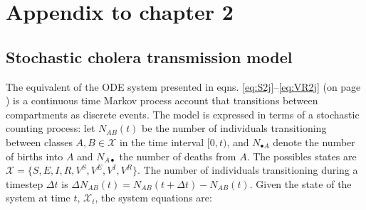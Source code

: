 \renewcommand{\thefigure}{\textsc{a}\arabic{figure}}
\renewcommand{\theequation}{\textsc{a}\arabic{equation}}
\renewcommand{\thetable}{\textsc{a}\arabic{table}}
\setcounter{figure}{0}
\setcounter{equation}{0}

\chapter{Appendix to chapter 2}
\section{Stochastic cholera transmission model}\label{sec:stoch}
The equivalent of the ODE system presented in eqns. \eqref{eq:S2j}--\eqref{eq:VR2j} (on page \pageref{eq:S2j}) is  a continuous time Markov process account that transitions between compartments as discrete events. The model is expressed in terms of a stochastic counting process\cite{Breto:TimeSeriesAnalysis:2009}: let \(N_{AB}(t)\) be the number of individuals
transitioning between classes \(A,B\in \mathcal{X}\) in the time
interval \([0,t)\), and \(N_{\bullet A}\) denote the number of births into \(A\) and \(N_{A\bullet}\) the number of deaths from \(A\).  The possibles states are
\(\mathcal{X} = \{S, E, I, R, V^S, V^E, V^I, V^R\}\).
The number of individuals transitioning  during a timestep $\Delta t$ is
\(\Delta N_{AB}(t) = N_{AB}(t+\Delta t) - N_{AB}(t)\). Given the state of the system at time \(t\), \(\mathcal{X}_t\), the system equations are:

